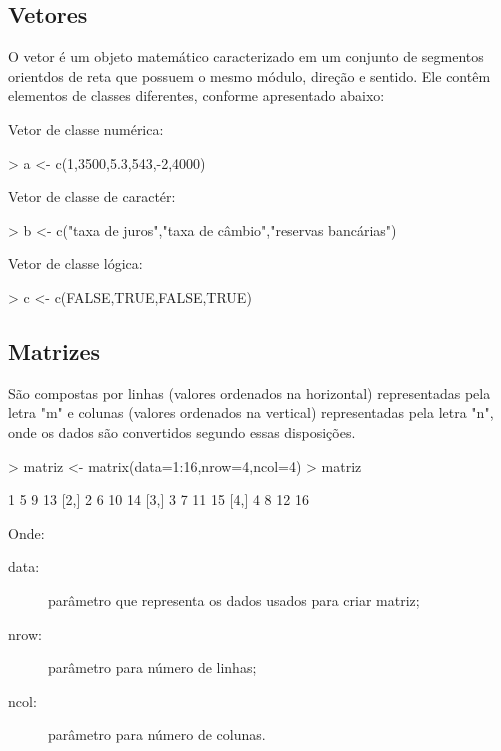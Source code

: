 \documentclass[12pt,a4paper,oneside]{erdc}
\begin{document}
\subsection{Vetores}
O vetor é um objeto matemático caracterizado em um conjunto de segmentos orientdos de reta que possuem o mesmo módulo, direção e sentido. Ele contêm elementos de classes diferentes, conforme apresentado abaixo:


Vetor de classe numérica:
\begin{Schunk}
\begin{Sinput}
> a <- c(1,3500,5.3,543,-2,4000)
\end{Sinput}
\end{Schunk}
Vetor de classe de caractér:
\begin{Schunk}
\begin{Sinput}
> b <- c("taxa de juros","taxa de câmbio","reservas bancárias") 
\end{Sinput}
\end{Schunk}
Vetor de classe lógica:
\begin{Schunk}
\begin{Sinput}
> c <- c(FALSE,TRUE,FALSE,TRUE) 
\end{Sinput}
\end{Schunk}
\subsection{Matrizes}
São compostas por linhas (valores ordenados na horizontal) representadas pela letra "m" e colunas (valores ordenados na vertical) representadas pela letra "n", onde os dados são convertidos segundo essas disposições.
\begin{Schunk}
\begin{Sinput}
> matriz <- matrix(data=1:16,nrow=4,ncol=4)
> matriz
\end{Sinput}
\begin{Soutput}
     [,1] [,2] [,3] [,4]
[1,]    1    5    9   13
[2,]    2    6   10   14
[3,]    3    7   11   15
[4,]    4    8   12   16
\end{Soutput}
\end{Schunk}
Onde:
       \begin{description}
       \item [data:] parâmetro que representa os dados usados para criar matriz;
       \item [nrow:] parâmetro para número de linhas;
       \item [ncol:] parâmetro para número de colunas.
       \end{description}
\end{document}
